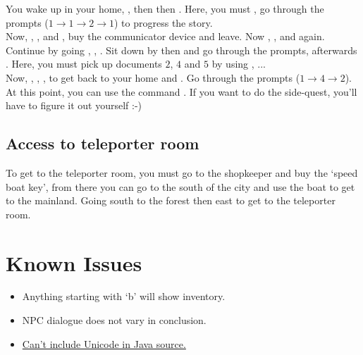 \documentclass{article}
\begin{document}
\begin{multicols}{2}
            You wake up in your home, , then  then . Here, you must , go through the prompts ($1 \rightarrow 1 \rightarrow 2 \rightarrow 1$) to progress the story. \\

            Now, , ,  and , buy the communicator device and leave. Now , ,  and  again. Continue by going , , . Sit down by  then  and go through the prompts, afterwards . Here, you must pick up documents $2$, $4$ and $5$ by using , ... \\

            Now, , , ,  to get back to your home and . Go through the prompts ($1 \rightarrow 4 \rightarrow 2$). At this point, you can use the command . If you want to do the side-quest, you'll have to figure it out yourself :-)

            \subsection{Access to teleporter room}
            To get to the teleporter room, you must go to the shopkeeper and buy the `speed boat key', from there you can go to the south of the city and use the boat to get to the mainland. Going south to the forest then east to get to the teleporter room.

        \section{Known Issues}
        
            \begin{itemize}[leftmargin=*]
                \item Anything starting with `b' will show inventory.
                \item NPC dialogue does not vary in conclusion.
                \item \hyperref[sec:emoji]{Can't include Unicode in Java source.}
            \end{itemize}

    \end{multicols}

    \newpage
\end{document}
